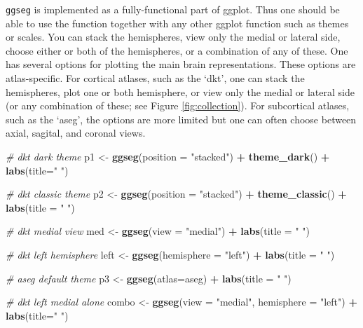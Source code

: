 \documentclass[fleqn,10pt]{wlpeerj} %
\newenvironment{Shaded}{\begin{snugshade}}{\end{snugshade}}
\newcommand{\CommentTok}[1]{\textcolor[rgb]{0.56,0.35,0.01}{\textit{#1}}}
\newcommand{\DataTypeTok}[1]{\textcolor[rgb]{0.13,0.29,0.53}{#1}}
\newcommand{\KeywordTok}[1]{\textcolor[rgb]{0.13,0.29,0.53}{\textbf{#1}}}
\newcommand{\NormalTok}[1]{#1}
\newcommand{\OperatorTok}[1]{\textcolor[rgb]{0.81,0.36,0.00}{\textbf{#1}}}
\newcommand{\StringTok}[1]{\textcolor[rgb]{0.31,0.60,0.02}{#1}}
\begin{document}
\texttt{ggseg} is implemented as a fully-functional part of ggplot.
Thus one should be able to use the function together with any other ggplot function such as themes or scales.
You can stack the hemispheres, view only the medial or lateral side, choose either or both of the hemispheres, or a combination of any of these.
One has several options for plotting the main brain representations.
These options are atlas-specific.
For cortical atlases, such as the `dkt', one can stack the hemispheres, plot one or both hemisphere, or view only the medial or lateral side (or any combination of these; see Figure \ref{fig:collection}).
For subcortical atlases, such as the `aseg', the options are more limited but one can often choose between axial, sagital, and coronal views.

\begin{Shaded}
\begin{Highlighting}[]
\CommentTok{# dkt dark theme}
\NormalTok{p1 <-}\StringTok{ }\KeywordTok{ggseg}\NormalTok{(}\DataTypeTok{position =} \StringTok{"stacked"}\NormalTok{) }\OperatorTok{+}
\StringTok{  }\KeywordTok{theme_dark}\NormalTok{() }\OperatorTok{+}
\StringTok{  }\KeywordTok{labs}\NormalTok{(}\DataTypeTok{title=}\StringTok{" "}\NormalTok{)}

\CommentTok{# dkt classic theme}
\NormalTok{p2 <-}\StringTok{ }\KeywordTok{ggseg}\NormalTok{(}\DataTypeTok{position =} \StringTok{"stacked"}\NormalTok{) }\OperatorTok{+}
\StringTok{  }\KeywordTok{theme_classic}\NormalTok{() }\OperatorTok{+}
\StringTok{  }\KeywordTok{labs}\NormalTok{(}\DataTypeTok{title =} \StringTok{" "}\NormalTok{)}

\CommentTok{# dkt medial view}
\NormalTok{med <-}\StringTok{ }\KeywordTok{ggseg}\NormalTok{(}\DataTypeTok{view =} \StringTok{"medial"}\NormalTok{) }\OperatorTok{+}
\StringTok{  }\KeywordTok{labs}\NormalTok{(}\DataTypeTok{title =} \StringTok{" "}\NormalTok{)}

\CommentTok{# dkt left hemisphere}
\NormalTok{left <-}\StringTok{ }\KeywordTok{ggseg}\NormalTok{(}\DataTypeTok{hemisphere =} \StringTok{"left"}\NormalTok{) }\OperatorTok{+}
\StringTok{  }\KeywordTok{labs}\NormalTok{(}\DataTypeTok{title =} \StringTok{" "}\NormalTok{)}


\CommentTok{# aseg default theme}
\NormalTok{p3 <-}\StringTok{ }\KeywordTok{ggseg}\NormalTok{(}\DataTypeTok{atlas=}\NormalTok{aseg) }\OperatorTok{+}
\StringTok{  }\KeywordTok{labs}\NormalTok{(}\DataTypeTok{title =} \StringTok{" "}\NormalTok{)}


\CommentTok{# dkt left medial alone}
\NormalTok{combo <-}\StringTok{ }\KeywordTok{ggseg}\NormalTok{(}\DataTypeTok{view =} \StringTok{"medial"}\NormalTok{,}
      \DataTypeTok{hemisphere =} \StringTok{"left"}\NormalTok{) }\OperatorTok{+}
\StringTok{  }\KeywordTok{labs}\NormalTok{(}\DataTypeTok{title=}\StringTok{" "}\NormalTok{)}


\end{Highlighting}
\end{Shaded}
\end{document}
